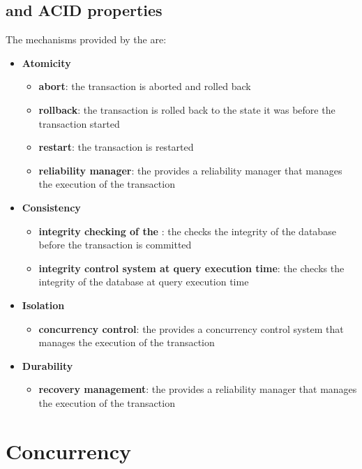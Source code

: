 \documentclass[english]{article}
\begin{document}
\subsection{\dbms and ACID properties}
The mechanisms provided by the \dbms are:

\begin{itemize}
  \item \textbf{Atomicity}
        \begin{itemize}
          \item \textbf{abort}: the transaction is aborted and rolled back
          \item \textbf{rollback}: the transaction is rolled back to the state it was before the transaction started
          \item \textbf{restart}: the transaction is restarted
          \item \textbf{reliability manager}: the \dbms provides a reliability manager that manages the execution of the transaction
        \end{itemize}
  \item \textbf{Consistency}
        \begin{itemize}
          \item \textbf{integrity checking of the \dbms}: the \dbms checks the integrity of the database before the transaction is committed
          \item \textbf{integrity control system at query execution time}: the \dbms checks the integrity of the database at query execution time
        \end{itemize}
  \item \textbf{Isolation}
        \begin{itemize}
          \item \textbf{concurrency control}: the \dbms provides a concurrency control system that manages the execution of the transaction
        \end{itemize}
  \item \textbf{Durability}
        \begin{itemize}
          \item \textbf{recovery management}: the \dbms provides a reliability manager that manages the execution of the transaction
        \end{itemize}
\end{itemize}

\clearpage

\section{Concurrency}
\end{document}
